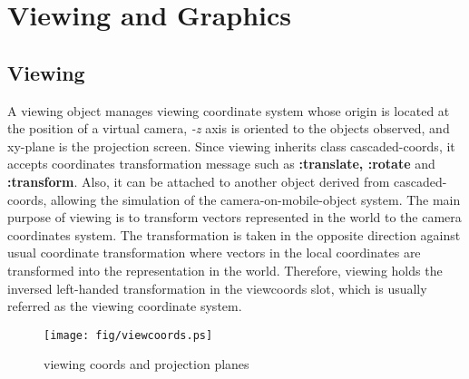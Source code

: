 \section{Viewing and Graphics}

\subsection{Viewing}
A viewing object manages viewing coordinate system
whose origin is located at the position of a virtual camera,
{\em -z} axis is oriented to the objects observed, and xy-plane is the
projection screen.
Since viewing inherits class cascaded-coords,
it accepts coordinates transformation message
such as {\bf :translate, :rotate} and {\bf :transform}.
Also, it can be attached to another object derived from cascaded-coords,
allowing the simulation of the camera-on-mobile-object system.
The main purpose of viewing is to transform vectors represented in the world
to the camera coordinates system.
The transformation is taken in the opposite direction against usual coordinate
transformation where vectors in the local coordinates are transformed into the
representation in the world.
Therefore, viewing holds the inversed left-handed transformation in
the viewcoords slot, which is usually referred as the viewing coordinate system.

\begin{figure}
\begin{center}
\texttt{[image: fig/viewcoords.ps]}
\end{center}
\caption{viewing coords and projection planes}
\end{figure}

